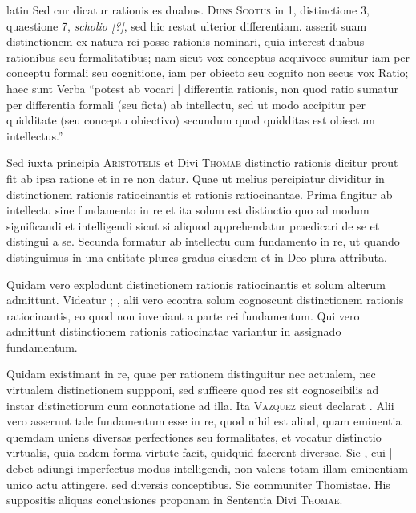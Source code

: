 \begin{otherlanguage*}{latin}
\pstart
Sed cur dicatur rationis es duabus. \textsc{Duns Scotus} in 1, distinctione 3, quaestione 7, \emph{scholio [?]}, sed hic restat ulterior differentiam. asserit suam distinctionem ex natura rei posse rationis nominari, quia interest duabus rationibus seu formalitatibus; nam sicut vox conceptus aequivoce sumitur iam per conceptu formali seu cognitione, iam per obiecto seu cognito non secus vox Ratio; haec sunt Verba \enquote{potest ab vocari \textnormal{|} differentia rationis, non quod ratio sumatur per differentia formali (seu ficta) ab intellectu, sed ut modo accipitur per quidditate (seu conceptu obiectivo) secundum quod quidditas est obiectum intellectus.} 
\pend

\pstart
Sed iuxta principia \textsc{Aristotelis} et Divi \textsc{Thomae} distinctio rationis dicitur prout fit ab ipsa ratione et in re non datur. Quae ut melius percipiatur dividitur in distinctionem rationis ratiocinantis et rationis ratiocinantae. Prima fingitur ab intellectu sine fundamento in re et ita solum est distinctio quo ad modum significandi et intelligendi sicut si aliquod apprehendatur praedicari de se et distingui a se. Secunda formatur ab intellectu cum fundamento in re, ut quando distinguimus in una entitate plures gradus eiusdem et in Deo plura attributa. 
\pend

\pstart
Quidam vero explodunt distinctionem rationis ratiocinantis et solum alterum admittunt. Videatur ; , alii vero econtra solum cognoscunt distinctionem rationis ratiocinantis, eo quod non inveniant a parte rei fundamentum. Qui vero admittunt distinctionem rationis ratiocinatae variantur in assignado fundamentum. 
\pend

\pstart
Quidam existimant in re, quae per rationem distinguitur nec actualem, nec virtualem distinctionem suppponi, sed sufficere quod res sit cognoscibilis ad instar distinctiorum cum connotatione ad illa. Ita \textsc{Vazquez} sicut declarat . Alii vero asserunt tale fundamentum esse in re, quod nihil est aliud, quam eminentia quemdam uniens diversas perfectiones seu formalitates, et vocatur distinctio virtualis, quia eadem forma virtute facit, quidquid facerent diversae. Sic , cui \textnormal{|} debet adiungi imperfectus modus intelligendi, non valens totam illam eminentiam unico actu attingere, sed diversis conceptibus. Sic communiter Thomistae. His suppositis aliquas conclusiones proponam in Sententia Divi \textsc{Thomae}. 
\pend


\end{otherlanguage*}
